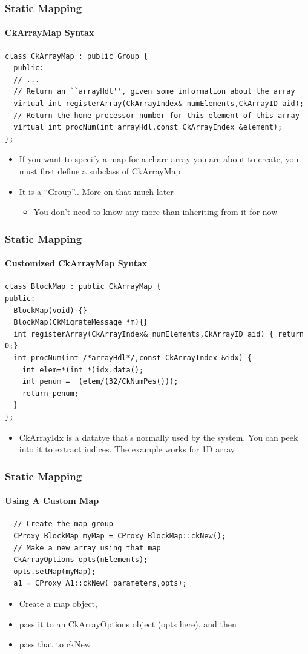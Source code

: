\begin{frame}[fragile]
  \frametitle{Static Mapping}
  \framesubtitle{CkArrayMap Syntax}
  \begin{lstlisting}
class CkArrayMap : public Group {
  public:
  // ...
  // Return an ``arrayHdl'', given some information about the array
  virtual int registerArray(CkArrayIndex& numElements,CkArrayID aid);
  // Return the home processor number for this element of this array
  virtual int procNum(int arrayHdl,const CkArrayIndex &element);
};
  \end{lstlisting}
  \begin{itemize}
    \item If you want to specify a map for a chare array you are about to create, you must first define a subclass of CkArrayMap
    \item It is a “Group”.. More on that much later
    \begin{itemize}
      \item You don’t need to know any more than inheriting from it for now
    \end{itemize}
  \end{itemize}
\end{frame}

\begin{frame}[fragile]
  \frametitle{Static Mapping}
  \framesubtitle{Customized CkArrayMap Syntax}
  \begin{lstlisting}
class BlockMap : public CkArrayMap {
public:
  BlockMap(void) {}
  BlockMap(CkMigrateMessage *m){}
  int registerArray(CkArrayIndex& numElements,CkArrayID aid) { return 0;}
  int procNum(int /*arrayHdl*/,const CkArrayIndex &idx) {
    int elem=*(int *)idx.data();
    int penum =  (elem/(32/CkNumPes()));
    return penum;
  }
};
    \end{lstlisting}
  \begin{itemize}
    \item CkArrayIdx is a datatye that’s normally used by the system. You can peek into it to extract indices. The example works for 1D array
  \end{itemize}
\end{frame}

\begin{frame}[fragile]
  \frametitle{Static Mapping}
  \framesubtitle{Using A Custom Map}
  \begin{lstlisting}
  // Create the map group
  CProxy_BlockMap myMap = CProxy_BlockMap::ckNew();
  // Make a new array using that map
  CkArrayOptions opts(nElements);
  opts.setMap(myMap);
  a1 = CProxy_A1::ckNew( parameters,opts);
  \end{lstlisting}
  \begin{itemize}
    \item Create a map object, 
    \item pass it to an CkArrayOptions object (opts here), and then 
    \item pass that to ckNew
  \end{itemize}
\end{frame}
